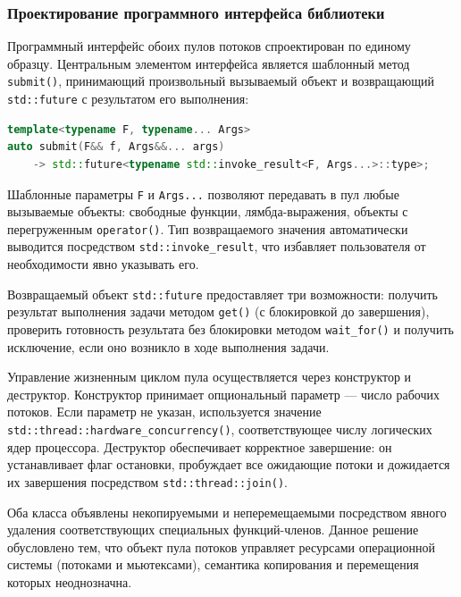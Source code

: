 \subsubsection{Проектирование программного интерфейса библиотеки}

Программный интерфейс обоих пулов потоков спроектирован по
единому образцу. Центральным элементом интерфейса является
шаблонный метод \texttt{submit()}, принимающий произвольный
вызываемый объект и возвращающий \texttt{std::future}
с результатом его выполнения:

\begin{lstlisting}[language=C++, caption={Интерфейс метода submit}]
template<typename F, typename... Args>
auto submit(F&& f, Args&&... args)
    -> std::future<typename std::invoke_result<F, Args...>::type>;
\end{lstlisting}

Шаблонные параметры \texttt{F} и \texttt{Args...} позволяют
передавать в пул любые вызываемые объекты: свободные функции,
лямбда-выражения, объекты с перегруженным \texttt{operator()}.
Тип возвращаемого значения автоматически выводится посредством
\texttt{std::invoke\_result}, что избавляет пользователя от
необходимости явно указывать его.

Возвращаемый объект \texttt{std::future} предоставляет три
возможности: получить результат выполнения задачи методом
\texttt{get()} (с блокировкой до завершения), проверить
готовность результата без блокировки методом \texttt{wait\_for()}
и получить исключение, если оно возникло в ходе выполнения
задачи.

Управление жизненным циклом пула осуществляется через конструктор
и деструктор. Конструктор принимает опциональный параметр ---
число рабочих потоков. Если параметр не указан, используется
значение \texttt{std::thread::hardware\_concurrency()},
соответствующее числу логических ядер процессора. Деструктор
обеспечивает корректное завершение: он устанавливает флаг
остановки, пробуждает все ожидающие потоки и дожидается их
завершения посредством \texttt{std::thread::join()}.

Оба класса объявлены некопируемыми и неперемещаемыми
посредством явного удаления соответствующих специальных
функций-членов. Данное решение обусловлено тем, что объект
пула потоков управляет ресурсами операционной системы
(потоками и мьютексами), семантика копирования и перемещения
которых неоднозначна.